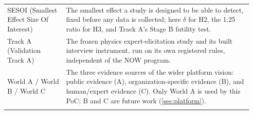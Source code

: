 \begin{longtable}{
    >{\raggedright\arraybackslash}p{3.2cm}
    >{\raggedright\arraybackslash}p{10.3cm}
  }
  \addlinespace[2pt]
  SESOI (Smallest Effect Size Of Interest) & The smallest effect a study is designed to be able to
    detect, fixed before any data is collected; here $\delta$ for H2, the 1.25 ratio for H3, and
    Track A's Stage B futility test. \\
  \addlinespace[2pt]
  Track A (Validation Track A) & The frozen physics expert-elicitation study and its built
    interview instrument, run on its own registered rules, independent of the NOW program. \\
  \addlinespace[2pt]
  World A / World B / World C & The three evidence sources of the wider platform vision: public
    evidence (A), organization-specific evidence (B), and human/expert evidence (C). Only World A
    is used by this PoC; B and C are future work (\cref{sec:platform}). \\
  \addlinespace[2pt]
\end{longtable}
\endgroup
